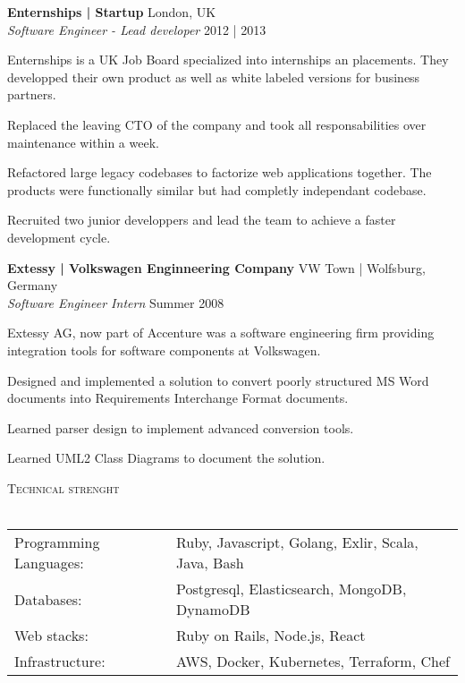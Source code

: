 \documentclass[a4paper]{article}
\newcommand{\lineunder} {
    \vspace*{-8pt} \\
    \hspace*{-18pt} \hrulefill \\
}
\newcommand{\header} [1] {
    {\hspace*{-18pt}\vspace*{6pt} \textsc{#1}}
    \vspace*{-6pt} \lineunder
}
\begin{document}
\vspace{2mm}
\raggedbottom

\textbf{Enternships | Startup} \hfill London, UK\\
\textit{Software Engineer - Lead developer} \hfill 2012 | 2013\\
\vspace{2mm}

\begin{itshape}
Enternships is a UK Job Board specialized into internships an placements.
They developped their own product as well as white labeled versions for business partners.
\end{itshape}

Replaced the leaving CTO of the company and took all responsabilities over maintenance within a week.

Refactored large legacy codebases to factorize web applications together.
The products were functionally similar but had completly independant codebase.

Recruited two junior developpers and lead the team to achieve a faster development cycle.

\vspace{2mm}
\raggedbottom

\textbf{Extessy | Volkswagen Enginneering Company} \hfill VW Town | Wolfsburg, Germany\\
\textit{Software Engineer Intern} \hfill Summer 2008\\
\vspace{2mm}

\begin{itshape}
Extessy AG, now part of Accenture was a software engineering firm providing integration tools for software components at Volkswagen.
\end{itshape}

Designed and implemented a solution to convert poorly structured MS Word documents into Requirements Interchange Format documents.

Learned parser design to implement advanced conversion tools.

Learned UML2 Class Diagrams to document the solution.

\vspace{2mm}
\raggedbottom

\header{Technical strenght}
\begin{tabular}{ l l }
    Programming Languages:  & Ruby, Javascript, Golang, Exlir, Scala, Java, Bash   \\
    Databases:              & Postgresql, Elasticsearch, MongoDB, DynamoDB  \\
    Web stacks:             & Ruby on Rails, Node.js, React                        \\
    Infrastructure:         & AWS, Docker, Kubernetes, Terraform, Chef             \\
\end{tabular}
\end{document}
